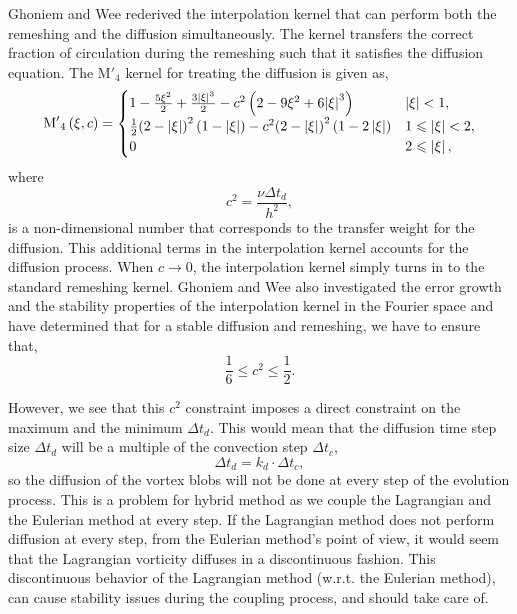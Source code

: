 Ghoniem and Wee rederived the interpolation kernel that can perform both the remeshing and the diffusion simultaneously. The kernel transfers the correct fraction of circulation during the remeshing such that it satisfies the diffusion equation. The $\mathrm{M'}_4$ kernel for treating the diffusion is given as,
	\begin{equation}
	{{{\rm{M'}}}_4}\left( {\xi ,c} \right) =
	  \begin{cases}
	   {1 - \frac{{5{\xi ^2}}}{2} + \frac{{3{{\left| \xi  \right|}^3}}}{2} - {c^2}\left( {2 - 9{\xi ^2} + 6{{\left| \xi  \right|}^3}} \right)} & {\left| \xi \right|} < 1, \\
	   \frac{1}{2}{\left( {2 - \left| \xi  \right|} \right)^2}\left( {1 - \left| \xi  \right|} \right) - {c^2}{\left( {2 - \left| \xi  \right|} \right)^2}\left( {1 - 2\left| \xi  \right|} \right) & 1 \leqslant {\left| \xi \right|} < 2,\\
	   0 & 2 \leqslant \left| \xi \right|,
	  \end{cases}
	\label{eq:modInterpKernel}
	\end{equation}
where 
	\begin{equation}
	c^2 = \frac{\nu \Delta t_d}{h^2},
	\label{eq:c2}
	\end{equation}
is a non-dimensional number that corresponds to the transfer weight for the diffusion. This additional terms in the interpolation kernel accounts for the diffusion process. When $c \rightarrow 0$, the interpolation kernel simply turns in to the standard remeshing kernel. Ghoniem and Wee also investigated the error growth and the stability properties of the interpolation kernel in the Fourier space and have determined that for a stable diffusion and remeshing, we have to ensure that,
	\begin{equation}
	\frac{1}{6} \leqslant c^2 \leqslant \frac{1}{2}.
	\label{eq:c2stability}
	\end{equation}

However, we see that this $c^2$ constraint imposes a direct constraint on the maximum and the minimum $\Delta t_d$. This would mean that the diffusion time step size $\Delta t_d$ will be a multiple of the convection step $\Delta t_c$,
	\begin{equation}
	\Delta t_d = k_d \cdot \Delta t_c,
	\end{equation}
so the diffusion of the vortex blobs will not be done at every step of the evolution process. This is a problem for hybrid method as we couple the Lagrangian and the Eulerian method at every step. If the Lagrangian method does not perform diffusion at every step, from the Eulerian method's point of view, it would seem that the Lagrangian vorticity diffuses in a discontinuous fashion. This discontinuous behavior of the Lagrangian method (w.r.t. the Eulerian method), can cause stability issues during the coupling process, and should take care of.

